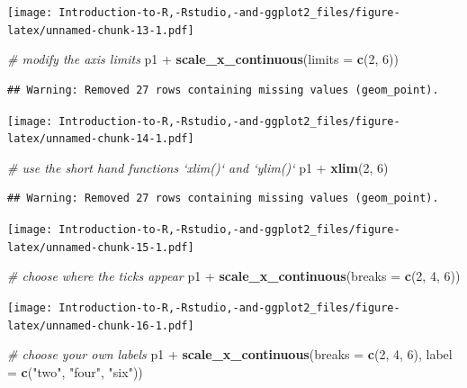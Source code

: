 \documentclass[]{book}
\newenvironment{Shaded}{\begin{snugshade}}{\end{snugshade}}
\newcommand{\KeywordTok}[1]{\textcolor[rgb]{0.13,0.29,0.53}{\textbf{{#1}}}}
\newcommand{\DataTypeTok}[1]{\textcolor[rgb]{0.13,0.29,0.53}{{#1}}}
\newcommand{\DecValTok}[1]{\textcolor[rgb]{0.00,0.00,0.81}{{#1}}}
\newcommand{\StringTok}[1]{\textcolor[rgb]{0.31,0.60,0.02}{{#1}}}
\newcommand{\CommentTok}[1]{\textcolor[rgb]{0.56,0.35,0.01}{\textit{{#1}}}}
\newcommand{\NormalTok}[1]{{#1}}
\begin{document}
\texttt{[image: Introduction-to-R,-Rstudio,-and-ggplot2\_files/figure-latex/unnamed-chunk-13-1.pdf]}

\begin{Shaded}
\begin{Highlighting}[]
\CommentTok{# modify the axis limits}
\NormalTok{p1 +}\StringTok{ }\KeywordTok{scale_x_continuous}\NormalTok{(}\DataTypeTok{limits =} \KeywordTok{c}\NormalTok{(}\DecValTok{2}\NormalTok{, }\DecValTok{6}\NormalTok{))}
\end{Highlighting}
\end{Shaded}

\begin{verbatim}
## Warning: Removed 27 rows containing missing values (geom_point).
\end{verbatim}

\texttt{[image: Introduction-to-R,-Rstudio,-and-ggplot2\_files/figure-latex/unnamed-chunk-14-1.pdf]}

\begin{Shaded}
\begin{Highlighting}[]
\CommentTok{# use the short hand functions `xlim()` and `ylim()`}
\NormalTok{p1 +}\StringTok{ }\KeywordTok{xlim}\NormalTok{(}\DecValTok{2}\NormalTok{, }\DecValTok{6}\NormalTok{)}
\end{Highlighting}
\end{Shaded}

\begin{verbatim}
## Warning: Removed 27 rows containing missing values (geom_point).
\end{verbatim}

\texttt{[image: Introduction-to-R,-Rstudio,-and-ggplot2\_files/figure-latex/unnamed-chunk-15-1.pdf]}

\begin{Shaded}
\begin{Highlighting}[]
\CommentTok{#  choose where the ticks appear}
\NormalTok{p1 +}\StringTok{ }\KeywordTok{scale_x_continuous}\NormalTok{(}\DataTypeTok{breaks =} \KeywordTok{c}\NormalTok{(}\DecValTok{2}\NormalTok{, }\DecValTok{4}\NormalTok{, }\DecValTok{6}\NormalTok{))}
\end{Highlighting}
\end{Shaded}

\texttt{[image: Introduction-to-R,-Rstudio,-and-ggplot2\_files/figure-latex/unnamed-chunk-16-1.pdf]}

\begin{Shaded}
\begin{Highlighting}[]
\CommentTok{#  choose your own labels}
\NormalTok{p1 +}\StringTok{ }\KeywordTok{scale_x_continuous}\NormalTok{(}\DataTypeTok{breaks =} \KeywordTok{c}\NormalTok{(}\DecValTok{2}\NormalTok{, }\DecValTok{4}\NormalTok{, }\DecValTok{6}\NormalTok{), }\DataTypeTok{label =} \KeywordTok{c}\NormalTok{(}\StringTok{"two"}\NormalTok{, }\StringTok{"four"}\NormalTok{, }\StringTok{"six"}\NormalTok{))}
\end{Highlighting}
\end{Shaded}
\end{document}
